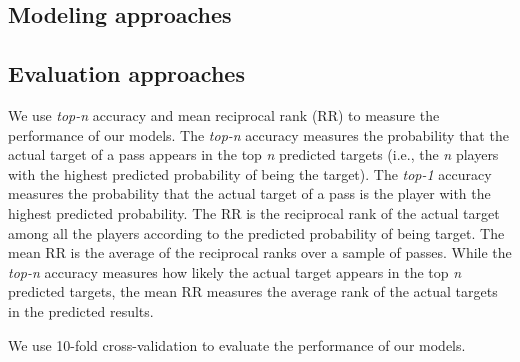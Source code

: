 \subsection{Modeling approaches}



\subsection{Evaluation approaches}

We use \textit{top-n} accuracy and mean reciprocal rank (RR) to measure the performance of our models.
The \textit{top-n} accuracy measures the probability that the actual target of a pass appears in the top \textit{n} predicted targets (i.e., the \textit{n} players with the highest predicted probability of being the target).
The \textit{top-1} accuracy measures the probability that the actual target of a pass is the player with the highest predicted probability.
The RR is the reciprocal rank of the actual target among all the players according to the predicted probability of being target.
The mean RR is the average of the reciprocal ranks over a sample of passes.
While the \textit{top-n} accuracy measures how likely the actual target appears in the top \textit{n} predicted targets, the mean RR measures the average rank of the actual targets in the predicted results.

We use 10-fold cross-validation to evaluate the performance of our models. 
